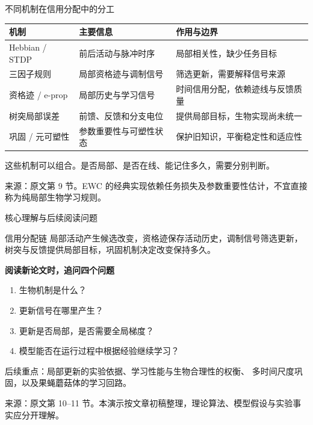 \documentclass[UTF8,aspectratio=169,10pt,fontset=fandol]{ctexbeamer}
\newcommand{\source}[1]{\par\vfill{\tiny\color{Muted}来源：#1}}
\begin{document}
\begin{frame}{不同机制在信用分配中的分工}
  \renewcommand{\arraystretch}{1.7}
  \small
  \begin{tabular}{p{2.7cm}p{4.4cm}p{5cm}}
    \toprule
    \textbf{机制} & \textbf{主要信息} & \textbf{作用与边界}\\
    \midrule
    Hebbian / STDP & 前后活动与脉冲时序 & 局部相关性，缺少任务目标\\
    三因子规则 & 局部资格迹与调制信号 & 筛选更新，需要解释信号来源\\
    资格迹 / e-prop & 局部历史与学习信号 & 时间信用分配，依赖迹线与反馈质量\\
    树突局部误差 & 前馈、反馈和分支电位 & 提供局部目标，生物实现尚未统一\\
    巩固 / 元可塑性 & 参数重要性与可塑性状态 & 保护旧知识，平衡稳定性和适应性\\
    \bottomrule
  \end{tabular}
  \medskip

  \normalsize\alert{这些机制可以组合。是否局部、是否在线、能记住多久，需要分别判断。}
  \source{原文第 9 节。EWC 的经典实现依赖任务损失及参数重要性估计，不宜直接称为纯局部生物学习规则。}
\end{frame}

\begin{frame}{核心理解与后续阅读问题}
  \begin{block}{信用分配链}
    局部活动产生候选改变，资格迹保存活动历史，调制信号筛选更新，
    树突与反馈提供局部目标，巩固机制决定改变保持多久。
  \end{block}
  \medskip
  \textbf{阅读新论文时，追问四个问题}
  \begin{enumerate}
    \item 生物机制是什么？
    \item 更新信号在哪里产生？
    \item 更新是否局部，是否需要全局梯度？
    \item 模型能否在运行过程中根据经验继续学习？
  \end{enumerate}
  \medskip
  {\small 后续重点：局部更新的实验依据、学习性能与生物合理性的权衡、
  多时间尺度巩固，以及果蝇蘑菇体的学习回路。}
  \source{原文第 10--11 节。本演示按文章初稿整理，理论算法、模型假设与实验事实应分开理解。}
\end{frame}
\end{document}
